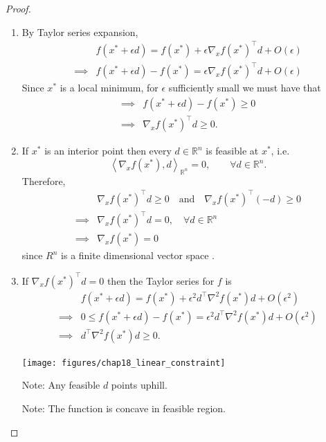 \documentclass{article}
\newcommand{\iprod}[1]{\left<#1\right>}
\begin{document}
	\begin{proof}
		
	\begin{enumerate}

	\item By Taylor series expansion,
	\begin{align*}
		& f(x^{\ast} + \epsilon d) = f(x^{\ast}) + \epsilon\nabla_xf(x^{\ast})^\top d+ O(\epsilon) \\
		\implies & f(x^{\ast}+\epsilon d) - f(x^{\ast}) = \epsilon\nabla_xf(x^{\ast})^\top d + O(\epsilon) 
	\end{align*}
	Since $x^{\ast}$ is a local minimum, for $\epsilon$ sufficiently small we must have that
	\begin{align*}
		\implies & f(x^{\ast} + \epsilon d) - f(x^{\ast}) \geq 0 \\
		\implies & \nabla_xf(x^{\ast})^\top d \geq 0.
	\end{align*}	

	\item  If $x^{\ast}$ is an interior point then every $d \in \mathbb{R}^n$ is feasible at $x^{\ast}$, i.e.
	\[ 
		\iprod{\nabla_xf(x^{\ast}), d }_{\mathbb{R}^n} = 0, \qquad \forall d\in\mathbb{R}^n. 
	\]
	Therefore,
	\begin{align*}
	  & \nabla_xf(x^{\ast})^\top d \geq 0 
	  	\quad \text{and} \quad 
	  	\nabla_xf(x^{\ast})^\top (-d) \geq 0\\
	  \implies & \nabla_xf(x^{\ast})^\top d = 0, \quad \forall d\in\mathbb{R}^n \\
	  \implies &  \nabla_xf(x^{\ast}) = 0
	\end{align*}
	since $R^n$ is a finite dimensional vector space	.

	\item  If $\nabla_xf(x^{\ast})^\top d = 0$ then the Taylor series for $f$ is
	\begin{align*}
		& f(x^{\ast}+\epsilon d) = f(x^{\ast}) + \epsilon^2d^\top \nabla^2f(x^{\ast})d + O(\epsilon^2) \\
		\implies &  0 \leq f(x^{\ast} + \epsilon d) - f(x^{\ast}) = \epsilon^2d^\top \nabla^2f(x^{\ast})d + O(\epsilon^2) \\
		\implies & d^\top \nabla^2f(x^{\ast})d \geq 0.
	\end{align*}
	\begin{center}
		\texttt{[image: figures/chap18\_linear\_constraint]}
	\end{center}

	Note:  Any feasible $d$ points uphill.
	
	Note:  The function is concave in feasible region.

	\end{enumerate}
	\end{proof}	
\end{document}
